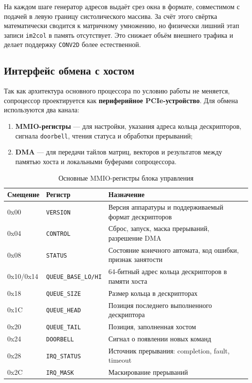 \documentclass[12pt,a4paper]{article}
\begin{document}
На каждом шаге генератор адресов выдаёт срез окна в формате, совместимом с подачей в левую границу систолического массива. За счёт этого свёртка математически сводится к матричному умножению, но физически лишний этап записи \texttt{im2col} в память отсутствует. Это снижает объём внешнего трафика и делает поддержку \texttt{CONV2D} более естественной.

\subsection{Интерфейс обмена с хостом}

Так как архитектура основного процессора по условию работы не меняется, сопроцессор проектируется как \textbf{периферийное PCIe-устройство}. Для обмена используются два канала:
\begin{enumerate}
    \item \textbf{MMIO-регистры} --- для настройки, указания адреса кольца дескрипторов, сигнала \texttt{doorbell}, чтения статуса и обработки прерываний;
    \item \textbf{DMA} --- для передачи тайлов матриц, векторов и результатов между памятью хоста и локальными буферами сопроцессора.
\end{enumerate}

\begin{table}[H]
    \centering
    \caption{Основные MMIO-регистры блока управления}
    \begin{tabular}{|C{2.0cm}|L{4.0cm}|L{7.2cm}|}
        \hline
        \textbf{Смещение} & \textbf{Регистр} & \textbf{Назначение} \\
        \hline
        0x00 & \texttt{VERSION} & Версия аппаратуры и поддерживаемый формат дескрипторов \\
        \hline
        0x04 & \texttt{CONTROL} & Сброс, запуск, маска прерываний, разрешение DMA \\
        \hline
        0x08 & \texttt{STATUS} & Состояние конечного автомата, код ошибки, признак занятости \\
        \hline
        0x10/0x14 & \texttt{QUEUE\_BASE\_LO/HI} & 64-битный адрес кольца дескрипторов в памяти хоста \\
        \hline
        0x18 & \texttt{QUEUE\_SIZE} & Размер кольца в дескрипторах \\
        \hline
        0x1C & \texttt{QUEUE\_HEAD} & Позиция последнего выполненного дескриптора \\
        \hline
        0x20 & \texttt{QUEUE\_TAIL} & Позиция, заполненная хостом \\
        \hline
        0x24 & \texttt{DOORBELL} & Сигнал о появлении новых команд \\
        \hline
        0x28 & \texttt{IRQ\_STATUS} & Источник прерывания: completion, fault, timeout \\
        \hline
        0x2C & \texttt{IRQ\_MASK} & Маскирование прерываний \\
        \hline
    \end{tabular}
\end{table}
\end{document}
